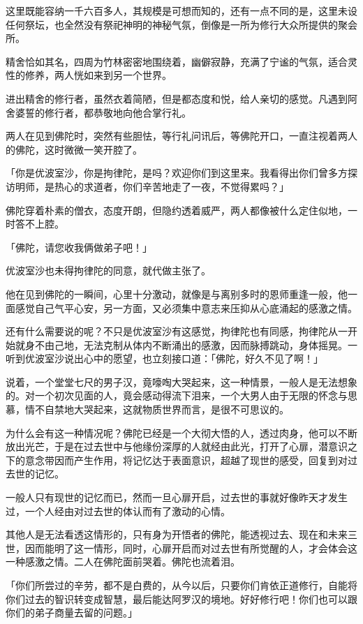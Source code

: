 \documentclass[12pt,twoside,openany]{book}
\begin{document}
这里既能容纳一千六百多人，其规模是可想而知的，还有一点不同的是，这里未设任何祭坛，也全然没有祭祀神明的神秘气氛，倒像是一所为修行大众所提供的聚会所。

精舍恰如其名，四周为竹林密密地围绕着，幽僻寂静，充满了宁谧的气氛，适合灵性的修养，两人恍如来到另一个世界。

进出精舍的修行者，虽然衣着简陋，但是都态度和悦，给人亲切的感觉。凡遇到阿舍婆誓的修行者，都恭敬地向他合掌行礼。

两人在见到佛陀时，突然有些胆怯，等行礼问讯后，等佛陀开口，一直注视着两人的佛陀，这时微微一笑开腔了。

「你是优波室沙，你是拘律陀，是吗？欢迎你们到这里来。我看得出你们曾多方探访明师，是热心的求道者，你们辛苦地走了一夜，不觉得累吗？」

佛陀穿着朴素的僧衣，态度开朗，但隐约透着威严，两人都像被什么定住似地，一时答不上腔。

「佛陀，请您收我俩做弟子吧！」

优波室沙也未得拘律陀的同意，就代做主张了。

他在见到佛陀的一瞬间，心里十分激动，就像是与离别多时的恩师重逢一般，他一面感觉自己气平心安，另一方面，又必须集中意志来压抑从心底涌起的感激之情。

还有什么需要说的呢？不只是优波室沙有这感觉，拘律陀也有同感，拘律陀从一开始就身不由己地，无法克制从体内不断涌出的感激，因而脉搏跳动，身体摇晃。一听到优波室沙说出心中的愿望，也立刻接口道：「佛陀，好久不见了啊！」

说着，一个堂堂七尺的男子汉，竟嚎啕大哭起来，这一种情景，一般人是无法想象的。对一个初次见面的人，竟会感动得流下泪来，一个大男人由于无限的怀念与思慕，情不自禁地大哭起来，这就物质世界而言，是很不可思议的。

为什么会有这一种情况呢？佛陀已经是一个大彻大悟的人，透过肉身，他可以不断放出光芒，于是在过去世中与他缘份深厚的人就经由此光，打开了心扉，潜意识之下的意念带因而产生作用，将记忆达于表面意识，超越了现世的感受，回复到对过去世的记忆。

一般人只有现世的记忆而已，然而一旦心扉开启，过去世的事就好像昨天才发生过，一个人经由对过去世的体认而有了激动的心情。

其他人是无法看透这情形的，只有身为开悟者的佛陀，能透视过去、现在和未来三世，因而能明了这一情形，同时，心扉开启而对过去世有所觉醒的人，才会体会这一种感激之情。二人在佛陀面前哭着。佛陀也流着泪。

「你们所尝过的辛劳，都不是白费的，从今以后，只要你们肯依正道修行，自能将你们过去的智识转变成智慧，最后能达阿罗汉的境地。好好修行吧！你们也可以跟你们的弟子商量去留的问题。」
\end{document}
